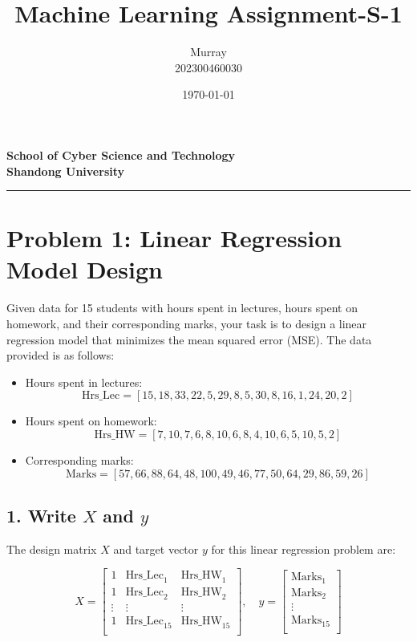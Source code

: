 \documentclass[a4paper,10pt]{article}
\begin{document}
\title{Machine Learning Assignment-S-1}
\author{Murray \\ 202300460030}
\date{\today}
\maketitle

\begin{center}
    \textbf{School of Cyber Science and Technology} \\
    \textbf{Shandong University}
\end{center}
\noindent\rule{\textwidth}{0.4pt} %

\newpage
\section*{Problem 1: Linear Regression Model Design}


Given data for 15 students with hours spent in lectures, hours spent on homework, and their corresponding marks, your task is to design a linear regression model that minimizes the mean squared error (MSE). The data provided is as follows:

\begin{itemize}
    \item Hours spent in lectures:
    \[
    \text{Hrs\_Lec} = [15, 18, 33, 22, 5, 29, 8, 5, 30, 8, 16, 1, 24, 20, 2]
    \]
    \item Hours spent on homework:
    \[
    \text{Hrs\_HW} = [7, 10, 7, 6, 8, 10, 6, 8, 4, 10, 6, 5, 10, 5, 2]
    \]
    \item Corresponding marks:
    \[
    \text{Marks} = [57, 66, 88, 64, 48, 100, 49, 46, 77, 50, 64, 29, 86, 59, 26]
    \]
\end{itemize}

\subsection*{1. Write \( X \) and \( y \)}

The design matrix \( X \) and target vector \( y \) for this linear regression problem are:

\[
X = \begin{bmatrix}
1 & \text{Hrs\_Lec}_1 & \text{Hrs\_HW}_1 \\
1 & \text{Hrs\_Lec}_2 & \text{Hrs\_HW}_2 \\
\vdots & \vdots & \vdots \\
1 & \text{Hrs\_Lec}_{15} & \text{Hrs\_HW}_{15} \\
\end{bmatrix}, \quad
y = \begin{bmatrix}
\text{Marks}_1 \\
\text{Marks}_2 \\
\vdots \\
\text{Marks}_{15} \\
\end{bmatrix}
\]
\end{document}
